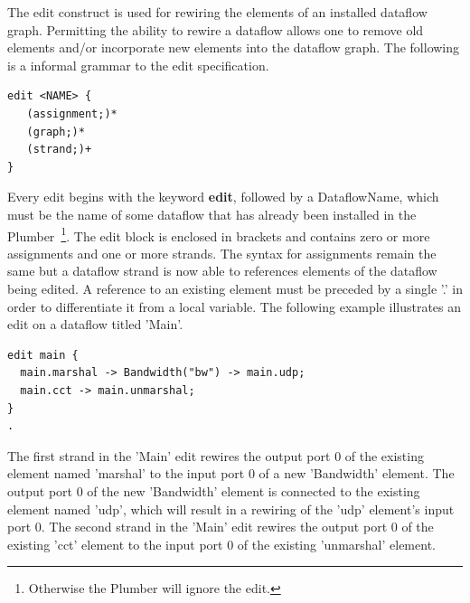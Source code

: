 \documentclass{article}
\begin{document}
The edit construct is used for rewiring the elements of an installed dataflow graph. 
Permitting the ability to rewire a dataflow allows one to remove old elements 
and/or incorporate new elements into the dataflow graph. The following is a 
informal grammar to the edit specification.

\begin{verbatim}
edit <NAME> {
   (assignment;)*
   (graph;)*
   (strand;)+
}
\end{verbatim}

Every edit begins with the keyword {\bf edit}, followed by a DataflowName, which
must be the name of some dataflow that has already been installed in the 
Plumber~\footnote{Otherwise the Plumber will ignore the edit.}. The edit
block is enclosed in brackets and contains zero or more assignments and one or
more strands. The syntax for assignments remain the same but a dataflow strand
is now able to references elements of the dataflow being edited. A reference
to an existing element must be preceded by a single '.' in order to differentiate 
it from a local variable. The following example illustrates an edit on a dataflow
titled 'Main'.

\begin{verbatim}
edit main {
  main.marshal -> Bandwidth("bw") -> main.udp;
  main.cct -> main.unmarshal;  
}
.
\end{verbatim}

The first strand in the 'Main' edit rewires the output port $0$ of the existing element
named 'marshal' to the input port $0$ of a new 'Bandwidth' element. 
The output port $0$ of the new 'Bandwidth' element is connected to the existing element
named 'udp', which will result in a rewiring of the 'udp' element's input port $0$. The
second strand in the 'Main' edit rewires the output port $0$ of the existing 'cct' element
to the input port $0$ of the existing 'unmarshal' element.



 




\end{document}
